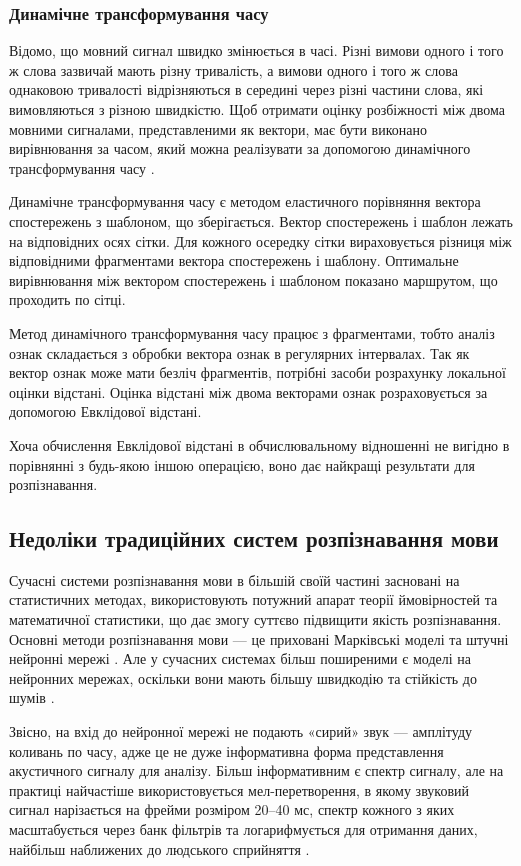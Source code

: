 \subsubsection{Динамічне трансформування часу}

Відомо, що мовний сигнал швидко змінюється в часі. Різні вимови одного і того ж слова зазвичай мають різну тривалість, а вимови одного і того ж слова однаковою тривалості відрізняються в середині через різні частини слова, які вимовляються з різною швидкістю. Щоб отримати оцінку розбіжності між двома мовними сигналами, представленими як вектори, має бути виконано вирівнювання за часом, який можна реалізувати за допомогою динамічного трансформування часу \cite{Goldenstein_2013}.

Динамічне трансформування часу є методом еластичного порівняння вектора спостережень з шаблоном, що зберігається. Вектор спостережень і шаблон лежать на відповідних осях сітки. Для кожного осередку сітки вираховується різниця між відповідними фрагментами вектора спостережень і шаблону. Оптимальне вирівнювання між вектором спостережень і шаблоном показано маршрутом, що проходить по сітці.

Метод динамічного трансформування часу працює з фрагментами, тобто аналіз ознак складається з обробки вектора ознак в регулярних інтервалах. Так як вектор ознак може мати безліч фрагментів, потрібні засоби розрахунку локальної оцінки відстані. Оцінка відстані між двома векторами ознак розраховується за допомогою Евклідової відстані.

Хоча обчислення Евклідової відстані в обчислювальному відношенні не вигідно в порівнянні з будь-якою іншою операцією, воно дає найкращі результати для розпізнавання.

\subsection{Недоліки традиційних систем розпізнавання мови}
Сучасні системи розпізнавання мови в більшій своїй частині засновані на статистичних методах, використовують потужний апарат теорії ймовірностей та математичної статистики, що дає змогу суттєво підвищити якість розпізнавання. Основні методи розпізнавання мови --- це приховані Марківські моделі та штучні нейронні мережі \cite{Makovkin_2006, Gefke_2012}. Але у сучасних системах більш поширеними є моделі на нейронних мережах, оскільки вони мають більшу швидкодію та стійкість до шумів \cite{Hinton_2012}.

Звісно, на вхід до нейронної мережі не подають «сирий» звук — амплітуду коливань по часу, адже це не дуже інформативна форма представлення акустичного сигналу для аналізу. Більш інформативним є спектр сигналу, але на практиці найчастіше використовується мел-перетворення, в якому звуковий сигнал нарізається на фрейми розміром 20–40 мс, спектр кожного з яких масштабується через банк фільтрів та логарифмується для отримання даних, найбільш наближених до людського сприйняття \cite{Saini_2013}.

